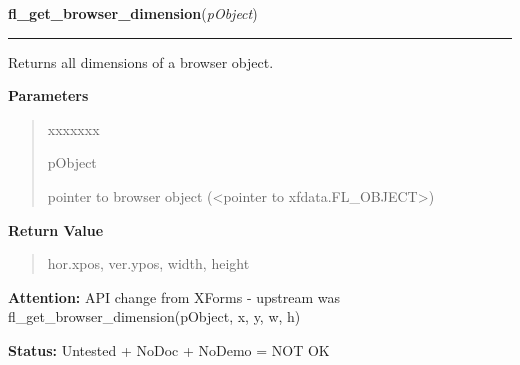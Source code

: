\hspace{.8\funcindent}\begin{boxedminipage}{\funcwidth}

    \raggedright \textbf{fl\_get\_browser\_dimension}(\textit{pObject})

    \vspace{-1.5ex}

    \rule{\textwidth}{0.5\fboxrule}
\setlength{\parskip}{2ex}
    Returns all dimensions of a browser object.

\setlength{\parskip}{1ex}
      \textbf{Parameters}
      \vspace{-1ex}

      \begin{quote}
        \begin{Ventry}{xxxxxxx}

          \item[pObject]

          pointer to browser object ({\textless}pointer to 
          xfdata.FL\_OBJECT{\textgreater})

        \end{Ventry}

      \end{quote}

      \textbf{Return Value}
    \vspace{-1ex}

      \begin{quote}
      hor.xpos, ver.ypos, width, height

      \end{quote}

\textbf{Attention:} API change from XForms - upstream was fl\_get\_browser\_dimension(pObject, 
x, y, w, h)



\textbf{Status:} Untested + NoDoc + NoDemo = NOT OK



    \end{boxedminipage}

    \label{xformslib:library:fl_set_browser_dblclick_callback}

    \vspace{0.5ex}

